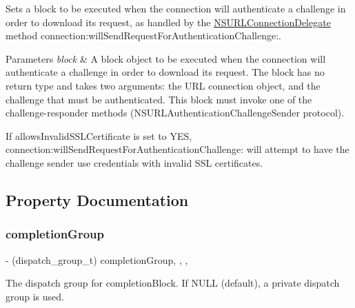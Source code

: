 Sets a block to be executed when the connection will authenticate a challenge in order to download its request, as handled by the {\ttfamily \mbox{\hyperlink{class_n_s_u_r_l_connection_delegate-p}{N\+S\+U\+R\+L\+Connection\+Delegate}}} method {\ttfamily connection\+:will\+Send\+Request\+For\+Authentication\+Challenge\+:}.


\begin{DoxyParams}{Parameters}
{\em block} & A block object to be executed when the connection will authenticate a challenge in order to download its request. The block has no return type and takes two arguments\+: the U\+RL connection object, and the challenge that must be authenticated. This block must invoke one of the challenge-\/responder methods (N\+S\+U\+R\+L\+Authentication\+Challenge\+Sender protocol).\\
\hline
\end{DoxyParams}
If {\ttfamily allows\+Invalid\+S\+S\+L\+Certificate} is set to Y\+ES, {\ttfamily connection\+:will\+Send\+Request\+For\+Authentication\+Challenge\+:} will attempt to have the challenge sender use credentials with invalid S\+SL certificates. 

\subsection{Property Documentation}
\mbox{\label{interface_a_f_u_r_l_connection_operation_aa4955286ccd61583815487d48e87dbdc}} 
\subsubsection{\texorpdfstring{completion\+Group}{completionGroup}}
{\footnotesize\ttfamily -\/ (dispatch\+\_\+group\+\_\+t) completion\+Group\hspace{0.3cm}{\ttfamily [read]}, {\ttfamily [write]}, {\ttfamily [nonatomic]}, {\ttfamily [assign]}}

The dispatch group for {\ttfamily completion\+Block}. If {\ttfamily N\+U\+LL} (default), a private dispatch group is used. \mbox{\label{interface_a_f_u_r_l_connection_operation_a18619e16ca125bb52c17c3ec80acccfb}} 
